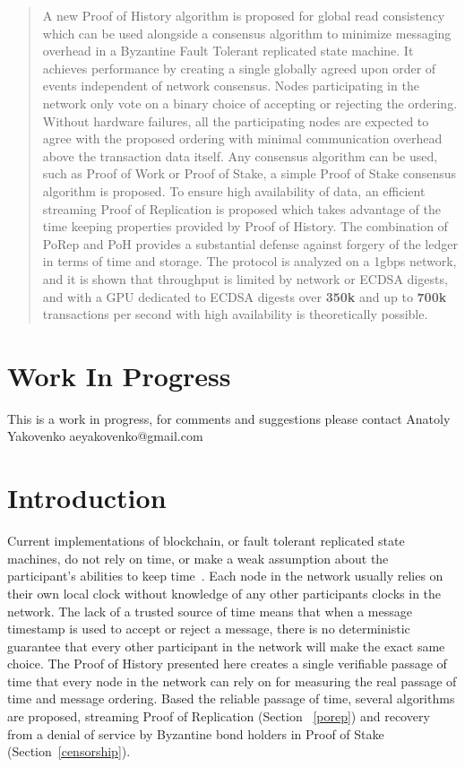 \documentclass[12pt]{article}
\begin{document}
\maketitle

\begin{abstract}
A new Proof of History algorithm is proposed for global read consistency which can be used alongside a consensus algorithm to minimize messaging overhead in a Byzantine Fault Tolerant replicated state machine. It achieves performance by creating a single globally agreed upon order of events independent of network consensus. Nodes participating in the network only vote on a binary choice of accepting or rejecting the ordering. Without hardware failures, all the participating nodes are expected to agree with the proposed ordering with minimal communication overhead above the transaction data itself. Any consensus algorithm can be used, such as Proof of Work or Proof of Stake, a simple Proof of Stake consensus algorithm is proposed. To ensure high availability of data, an efficient streaming Proof of Replication is proposed which takes advantage of the time keeping properties provided by Proof of History. The combination of PoRep and PoH provides a substantial defense against forgery of the ledger in terms of time and storage. The protocol is analyzed on a 1gbps network, and it is shown that throughput is limited by network or ECDSA digests, and with a GPU dedicated to ECDSA digests over \textbf{350k} and up to \textbf{700k} transactions per second with high availability is theoretically possible.

\end{abstract}

\section{Work In Progress}
This is a work in progress, for comments and suggestions please contact Anatoly Yakovenko aeyakovenko@gmail.com

\section{Introduction}
Current implementations of blockchain, or fault tolerant replicated state machines, do not rely on time, or make a weak assumption about the participant’s abilities to keep time~\cite{tendermint}.  Each node in the network usually relies on their own local clock without knowledge of any other participants clocks in the network.  The lack of a trusted source of time means that when a message timestamp is used to accept or reject a message, there is no deterministic guarantee that every other participant in the network will make the exact same choice.  The Proof of History presented here creates a single verifiable passage of time that every node in the network can rely on for measuring the real passage of time and message ordering.  Based the reliable passage of time, several algorithms are proposed, streaming Proof of Replication (Section ~\ref{porep}) and recovery from a denial of service by Byzantine bond holders in Proof of Stake (Section~\ref{censorship}).
\end{document}
